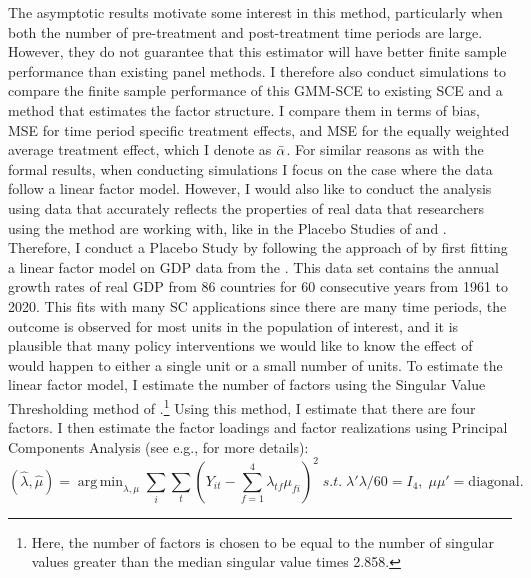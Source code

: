 \documentclass{article}
\DeclareMathOperator*{\argmin}{arg\,min}
\begin{document}
The asymptotic results motivate some interest in this method, particularly when both the number of pre-treatment and post-treatment time periods are large. However, they do not guarantee that this estimator will have better finite sample performance than existing panel methods. I therefore also conduct simulations to compare the finite sample performance of this GMM-SCE to existing SCE and a method that estimates the factor structure. I compare them in terms of bias, MSE for time period specific treatment effects, and MSE for the equally weighted average treatment effect, which I denote as $\Bar{\alpha}$. For similar reasons as with the formal results, when conducting simulations I focus on the case where the data follow a linear factor model. However, I would also like to conduct the analysis using data that accurately reflects the properties of real data that researchers using the method are working with, like in the Placebo Studies of \cite{BertrandDufloMullainathan} and \cite{SDID}. Therefore, I conduct a Placebo Study by following the approach of \cite{SDID} by first fitting a linear factor model on GDP data from the \cite{WB-GDP-Growth}. This data set contains the annual growth rates of real GDP from 86 countries for 60 consecutive years from 1961 to 2020. This fits with many SC applications since there are many time periods, the outcome is observed for most units in the population of interest, and it is plausible that many policy interventions we would like to know the effect of would happen to either a single unit or a small number of units. To estimate the linear factor model, I estimate the number of factors using the Singular Value Thresholding method of \cite{OptimalSVThresholding}.\footnote{Here, the number of factors is chosen to be equal to the number of singular values greater than the median singular value times 2.858.} Using this method, I estimate that there are four factors. I then estimate the factor loadings and factor realizations using Principal Components Analysis (see e.g., \cite{Bai2009_ife} for more details):
\begin{equation*}
    (\hat{\lambda}, \hat{\mu}) = \argmin_{\lambda, \mu} \sum_{i} \sum_{t} (Y_{it} - \sum_{f =1}^4 \lambda_{tf}\mu_{fi})^2 \; s.t. \; \lambda'\lambda/60 = I_4, \; \mu \mu' = \text{diagonal}.
\end{equation*}
\par
\end{document}
